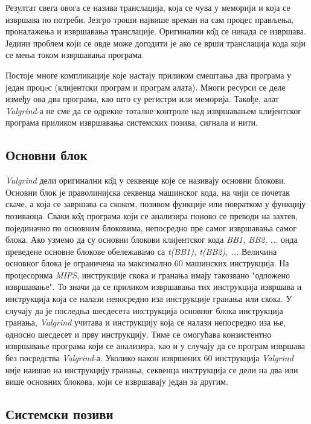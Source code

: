 \documentclass[12pt,oneside]{memoir}
\begin{document}
\indent Резултат свега овога се назива транслација, која се чува у меморији и која се извршава по потреби. Језгро троши највише времан на сам процес прављења, проналажења и извршавања транслације. Оригинални к\^{о}д се никада се извршава. Једини проблем који се овде може догодити је ако се врши транслација кода који се мења током извршавања програма.

\indent Постоје многе компликације које настају приликом смештања два програма у један процeс (клијентски програм и програм алата). Многи ресурси се деле између ова два програма, као што су регистри или меморија. Такође, алат \textit{Valgrind}-а не сме да се одрекне тоталне контроле над извршавањем клијентског програма приликом извршавања системских позива, сигнала и нити.

\subsection{Основни блок}

\indent \textit{Valgrind} дели оригинални к\^{о}д у секвенце које се називају основни блокови. Основни блок је праволинијска секвенца машинског кода, на чији се почетак скаче, а која се завршава са скоком, позивом функције или повратком у функцију позиваоца. Сваки к\^{о}д програма који се анализира поново се преводи на захтев, појединачно по основним блоковима, непосредно пре самог извршавања самог блока. Ако узмемо да су основни блокови клијентског кода \textit{BB1, BB2, ...} онда преведене основне блокове обележавамо са \textit{t(BB1), t(BB2), ...} Величина основног блока је ограничена на максимално 60 машинских инструкција. На процесорима \textit{MIPS}, инструкције скока и гранања имају такозвано "одложено извршавање". То значи да се приликом извршавања тих инструкција извршава и инструкција која се налази непосредно иза инструкције гранања или скока. У случају да је последња шесдесета инструкција основног блока инструкција гранања, \textit{Valgrind} учитава и инструкцију која се налази непосредно иза ње, односно шесдесет и прву инструкцију. Тиме се омогућава конзистентно извршавање програма који се анализира, као и у случају да се програм извршава без посредства \textit{Valgrind}-а. Уколико након извршених 60 инструкција \textit{Valgrind} није наишао на инструкцију гранања, секвенца инструкција се дели на два или више основних блокова, који се извршавају један за другим.



\subsection{Системски позиви}
\end{document}
